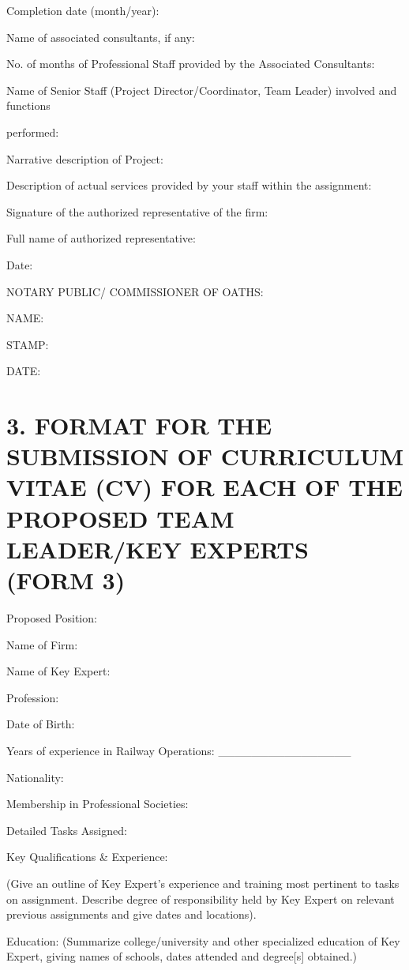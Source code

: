 Completion date (month/year):

Name of associated consultants, if any:

No. of months of Professional Staff provided by the Associated
Consultants:

Name of Senior Staff (Project Director/Coordinator, Team Leader)
involved and functions

performed:

Narrative description of Project:

Description of actual services provided by your staff within the
assignment:

Signature of the authorized representative of the firm:

Full name of authorized representative:

Date:

NOTARY PUBLIC/ COMMISSIONER OF OATHS:

NAME:

STAMP:

DATE:

\section{3. FORMAT FOR THE SUBMISSION OF CURRICULUM VITAE (CV) FOR EACH
	OF THE PROPOSED TEAM LEADER/KEY EXPERTS (FORM
	3)}\label{format-for-the-submission-of-curriculum-vitae-cv-for-each-of-the-proposed-team-leaderkey-experts-form-3}

Proposed Position:

Name of Firm:

Name of Key Expert:

Profession:

Date of Birth:

Years of experience in Railway Operations:
\_\_\_\_\_\_\_\_\_\_\_\_\_\_\_\_

Nationality:

Membership in Professional Societies:

Detailed Tasks Assigned:

Key Qualifications \& Experience:

(Give an outline of Key Expert's experience and training most pertinent
to tasks on assignment. Describe degree of responsibility held by Key
Expert on relevant previous assignments and give dates and locations).

Education: (Summarize college/university and other specialized education
of Key Expert, giving names of schools, dates attended and degree{[}s{]}
obtained.)

